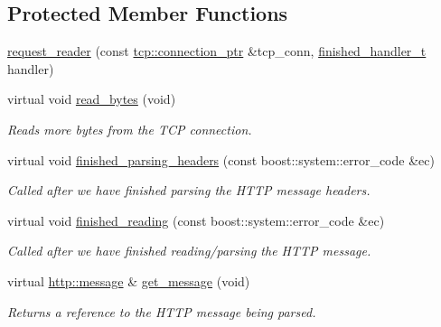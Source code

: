 \subsection*{Protected Member Functions}
\begin{DoxyCompactItemize}
\item 
\hyperlink{classpion_1_1http_1_1request__reader_aa90d6916e57f258a0536456e94584aca}{request\-\_\-reader} (const \hyperlink{namespacepion_1_1tcp_a6c9b7497068009f6d81d95ec0b0627d6}{tcp\-::connection\-\_\-ptr} \&tcp\-\_\-conn, \hyperlink{classpion_1_1http_1_1request__reader_a4cc323f3e852134f2ac785e51e1d623e}{finished\-\_\-handler\-\_\-t} handler)
\item 
virtual void \hyperlink{classpion_1_1http_1_1request__reader_a0414343e9f3376f751230ba4483d74ae}{read\-\_\-bytes} (void)
\begin{DoxyCompactList}\small\item\em Reads more bytes from the T\-C\-P connection. \end{DoxyCompactList}\item 
virtual void \hyperlink{classpion_1_1http_1_1request__reader_abe3db3cee63f040d4af8ce72263f01f1}{finished\-\_\-parsing\-\_\-headers} (const boost\-::system\-::error\-\_\-code \&ec)
\begin{DoxyCompactList}\small\item\em Called after we have finished parsing the H\-T\-T\-P message headers. \end{DoxyCompactList}\item 
virtual void \hyperlink{classpion_1_1http_1_1request__reader_aeeb55569c505d21767389ddcb5c51633}{finished\-\_\-reading} (const boost\-::system\-::error\-\_\-code \&ec)
\begin{DoxyCompactList}\small\item\em Called after we have finished reading/parsing the H\-T\-T\-P message. \end{DoxyCompactList}\item 
virtual \hyperlink{classpion_1_1http_1_1message}{http\-::message} \& \hyperlink{classpion_1_1http_1_1request__reader_a62124c27ecd6404e7f1124391adabfd4}{get\-\_\-message} (void)
\begin{DoxyCompactList}\small\item\em Returns a reference to the H\-T\-T\-P message being parsed. \end{DoxyCompactList}\end{DoxyCompactItemize}
